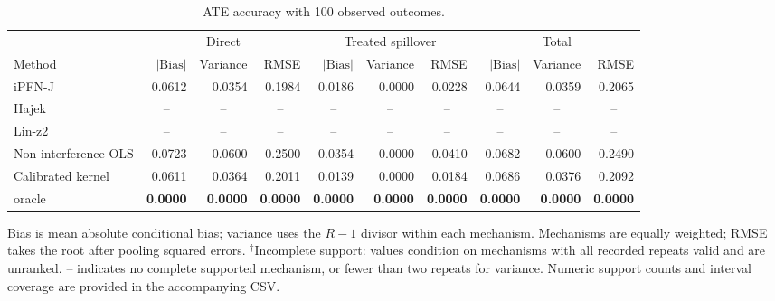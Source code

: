 \begin{table}[tb]
\centering
\caption{ATE accuracy with 100 observed outcomes.}
\begingroup\footnotesize
\setlength{\tabcolsep}{3pt}
\begin{tabular*}{\linewidth}{@{\extracolsep{\fill}}l*{9}{r}@{}}
\toprule
&\multicolumn{3}{c}{Direct}&\multicolumn{3}{c}{Treated spillover}&\multicolumn{3}{c}{Total}\\
\cmidrule(lr){2-4}\cmidrule(lr){5-7}\cmidrule(lr){8-10}
Method&$|\mathrm{Bias}|$&Variance&RMSE&$|\mathrm{Bias}|$&Variance&RMSE&$|\mathrm{Bias}|$&Variance&RMSE\\
\midrule
iPFN-J & \cellcolor{blue!11}0.0612 & \cellcolor{blue!17}0.0354 & \cellcolor{blue!17}0.1984 & \cellcolor{blue!11}0.0186 & \cellcolor{blue!11}0.0000 & \cellcolor{blue!11}0.0228 & \cellcolor{blue!17}0.0644 & \cellcolor{blue!17}0.0359 & \cellcolor{blue!17}0.2065 \\
Hajek & \multicolumn{1}{c}{--} & \multicolumn{1}{c}{--} & \multicolumn{1}{c}{--} & \multicolumn{1}{c}{--} & \multicolumn{1}{c}{--} & \multicolumn{1}{c}{--} & \multicolumn{1}{c}{--} & \multicolumn{1}{c}{--} & \multicolumn{1}{c}{--} \\
Lin-z2 & \multicolumn{1}{c}{--} & \multicolumn{1}{c}{--} & \multicolumn{1}{c}{--} & \multicolumn{1}{c}{--} & \multicolumn{1}{c}{--} & \multicolumn{1}{c}{--} & \multicolumn{1}{c}{--} & \multicolumn{1}{c}{--} & \multicolumn{1}{c}{--} \\
Non-interference OLS & \cellcolor{blue!7}0.0723 & \cellcolor{blue!7}0.0600 & \cellcolor{blue!7}0.2500 & \cellcolor{blue!7}0.0354 & \cellcolor{blue!17}0.0000 & \cellcolor{blue!7}0.0410 & \cellcolor{blue!11}0.0682 & \cellcolor{blue!7}0.0600 & \cellcolor{blue!7}0.2490 \\
Calibrated kernel & \cellcolor{blue!17}0.0611 & \cellcolor{blue!11}0.0364 & \cellcolor{blue!11}0.2011 & \cellcolor{blue!17}0.0139 & \cellcolor{blue!7}0.0000 & \cellcolor{blue!17}0.0184 & \cellcolor{blue!7}0.0686 & \cellcolor{blue!11}0.0376 & \cellcolor{blue!11}0.2092 \\
oracle & \cellcolor{blue!24}\textbf{0.0000} & \cellcolor{blue!24}\textbf{0.0000} & \cellcolor{blue!24}\textbf{0.0000} & \cellcolor{blue!24}\textbf{0.0000} & \cellcolor{blue!24}\textbf{0.0000} & \cellcolor{blue!24}\textbf{0.0000} & \cellcolor{blue!24}\textbf{0.0000} & \cellcolor{blue!24}\textbf{0.0000} & \cellcolor{blue!24}\textbf{0.0000} \\
\bottomrule
\end{tabular*}\endgroup
\vspace{3pt}
\begin{minipage}{\linewidth}\scriptsize
Bias is mean absolute conditional bias; variance uses the $R-1$ divisor within each mechanism.
Mechanisms are equally weighted; RMSE takes the root after pooling squared errors.
$^{\dagger}$Incomplete support: values condition on mechanisms with all recorded repeats valid and are unranked.
-- indicates no complete supported mechanism, or fewer than two repeats for variance.
Numeric support counts and interval coverage are provided in the accompanying CSV.
\end{minipage}
\end{table}

